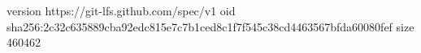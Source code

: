 version https://git-lfs.github.com/spec/v1
oid sha256:2c32c635889cba92edc815e7c7b1ced8c1f7f545c38cd4463567bfda60080fef
size 460462
